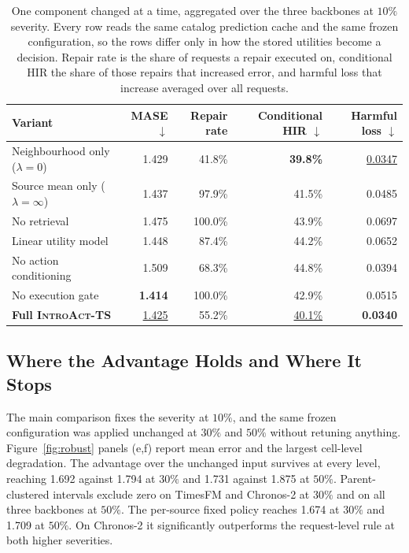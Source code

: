 \documentclass{article}
\newcommand{\best}[1]{\textbf{#1}}
\newcommand{\second}[1]{\underline{#1}}
\newcommand{\introact}{\textsc{IntroAct-TS}}
\begin{document}
\begin{table}[t]
  \caption{One component changed at a time, aggregated over the three backbones at $10\%$
  severity. Every row reads the same catalog prediction cache and the same frozen
  configuration, so the rows differ only in how the stored utilities become a decision. Repair
  rate is the share of requests a repair executed on, conditional HIR the share of those
  repairs that increased error, and harmful loss that increase averaged over all requests.}
  \label{tab:ablation}
  \centering
  \small
  \setlength{\tabcolsep}{4pt}
\begin{tabularx}{\textwidth}{@{}Xrrrr@{}}
    \toprule
    Variant & MASE $\downarrow$ & Repair rate & Conditional HIR $\downarrow$ & Harmful loss $\downarrow$ \\
    \midrule
    Neighbourhood only ($\lambda=0$) & 1.429 & 41.8\% & \best{39.8\%} & \second{0.0347} \\
    Source mean only ($\lambda=\infty$) & 1.437 & 97.9\% & 41.5\% & 0.0485 \\
    No retrieval & 1.475 & 100.0\% & 43.9\% & 0.0697 \\
    Linear utility model & 1.448 & 87.4\% & 44.2\% & 0.0652 \\
    No action conditioning & 1.509 & 68.3\% & 44.8\% & 0.0394 \\
    \midrule
    No execution gate & \best{1.414} & 100.0\% & 42.9\% & 0.0515 \\
    \midrule
    \rowcolor{bestgray}\textbf{Full \introact{}} & \second{1.425} & 55.2\% & \second{40.1\%} & \best{0.0340} \\
\bottomrule
  \end{tabularx}
\end{table}

\subsection{Where the Advantage Holds and Where It Stops}
\label{sec:exp-robust}
The main comparison fixes the severity at $10\%$, and the same frozen configuration was
applied unchanged at $30\%$ and $50\%$ without retuning anything. Figure~\ref{fig:robust}
panels (e,f) report mean error and the largest cell-level degradation. The advantage over the unchanged input survives at every level, reaching
1.692 against 1.794 at $30\%$ and 1.731 against 1.875 at $50\%$. Parent-clustered intervals
exclude zero on TimesFM and Chronos-2 at $30\%$ and on all three backbones at $50\%$. The
per-source fixed policy reaches 1.674 at $30\%$ and 1.709 at $50\%$. On Chronos-2 it
significantly outperforms the request-level rule at both higher severities.
\end{document}
